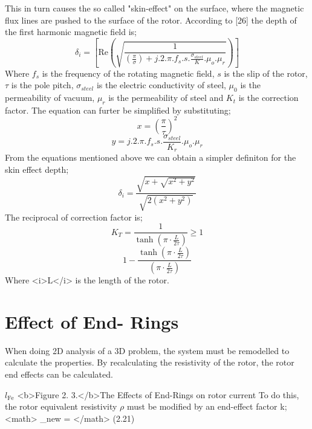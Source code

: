 This in turn causes the so called "skin-effect" on the surface, where the magnetic
flux lines are pushed to the surface of the rotor. According to [26] the depth of the
first harmonic magnetic field is;
%
\begin{equation*}
  \delta_{i} = \left[ \text{Re} \left( \sqrt{\frac{1}{\left(\frac{\pi}{\sigma}\right) + j.2.\pi.f_{s}.s.\frac{\sigma_{steel}}{K}.\mu_{o}.\mu_{r}}} \right) \right]
\end{equation*}
%
Where $f_s$ is the frequency of the rotating magnetic field, $s$ is the slip of the rotor, $\tau$ is
the pole pitch, $\sigma_{steel}$ is the electric conductivity of steel, $\mu_0$ is the permeability of
vacuum, $\mu_r$ is the permeability of steel and $K_t$ is the correction factor. The equation
can furter be simplified by substituting;
%
\begin{equation}\label{eq:2.17}
x = \left(\frac{\pi}{\tau}\right)^2
\end{equation}
%
%
\begin{equation}\label{eq:2.18}
y = j.2.\pi.f_s.s.\frac{\sigma_{steel}}{K_r}.\mu_o.\mu_r
\end{equation}
%
From the equations mentioned above we can obtain a simpler definiton for the skin
effect depth;
%
\begin{equation}\label{eq:2.19}
\delta_{i} = \frac{\sqrt{x + \sqrt{x^{2} + y^{2}}}}{\sqrt{2(x^{2} + y^{2})}}
\end{equation}
%
The reciprocal of correction factor is;
%
\begin{equation*}
  K_{T} = \frac{1}{\tanh\left(\pi \cdot \frac{L}{2\tau}\right)} \ge 1
\end{equation*}
%
\begin{equation}\label{eq:2.20}
1 - \frac{\tanh\left(\pi \cdot \frac{L}{2\tau}\right)}{\left(\pi \cdot \frac{L}{2\tau}\right)}
\end{equation}
%
Where <i>L</i> is the length of the rotor.

\section{Effect of End- Rings} %

When doing 2D analysis of a 3D problem, the system must be remodelled to
calculate the properties. By recalculating the resistivity of the rotor, the rotor end
effects can be calculated.

$l_{\text{Fe}}$
<b>Figure 2. 3.</b>The Effects of End-Rings on rotor current
To do this, the rotor equivalent resistivity $\rho$ must be modified by an end-effect factor
k;
<math>
\rho_{new} = 
</math>
(2.21)

